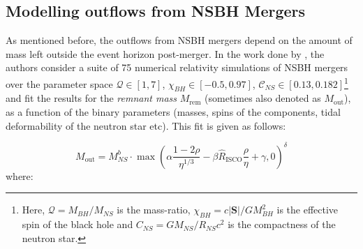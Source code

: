     \subsection{Modelling outflows from NSBH Mergers}\label{ssec:outflows-nsbh}

    As mentioned before, the outflows from NSBH mergers depend on the amount of mass
    left outside the event horizon post-merger. In the work done by \cite{foucart_2018},
    the authors consider a suite of 75 numerical relativity simulations of NSBH mergers
    over the parameter space $\mathcal{Q} \in [1, 7]$, $ \chi_{BH} \in [-0.5, 0.97]$,
    $\mathcal{C}_{NS} \in [0.13, 0.182]$\footnote{
        Here, $\mathcal{Q} = M_{BH}/M_{NS}$ is the mass-ratio, $\chi_{BH} =
        c|\mathbf{S}|/GM_{BH}^2$ is the effective spin of the black hole and $C_{NS} =
        GM_{NS}/R_{NS}c^2$ is the compactness of the neutron star.
    }
    and fit the results for the \textit{remnant mass} $M_{\mathrm{rem}}$ (sometimes also
    denoted as $M_{\mathrm{out}}$), as a function of the binary parameters (masses,
    spins of the components, tidal deformability of the neutron star etc). This fit is
    given as follows:

    \begin{equation}
        M_{\mathrm{out}} =
            M_{NS}^b \cdot
            \max \left( \alpha \dfrac{1-2\rho}{\eta^{1/3}} -
            \beta \hat{R}_{\mathrm{ISCO}} \dfrac{\rho}{\eta} + \gamma, 0 \right)^\delta
        \label{eq:m_out}
    \end{equation}
    where:

